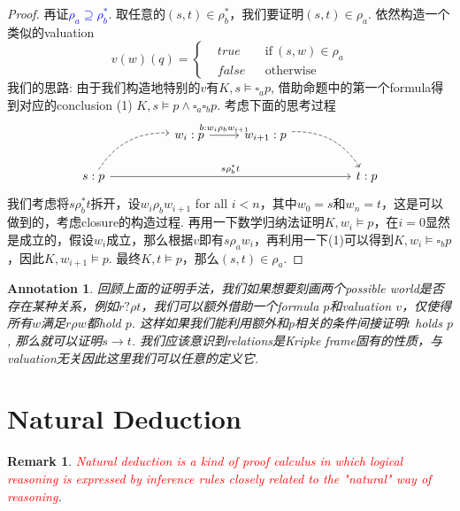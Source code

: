 \documentclass{article}
\theoremstyle{plain}
\newtheorem{remark}[theorem]{Remark}
\newtheorem{annotation}[theorem]{Annotation}
\theoremstyle{nonumberplain}
\newtheorem{proof}{Proof}
\newcommand{\redt}[1]{\textcolor{red}{#1}}
\newcommand{\bluet}[1]{\textcolor{blue}{#1}}
\begin{document}
\begin{proof}
再证\bluet{$\rho_a \supseteq \rho_b^*$}. 取任意的$(s,t) \in \rho_b^*$，我们要证明$(s,t) \in \rho_a$. 依然构造一个类似的valuation
$$
v(w)(q) = \left\{
\begin{aligned}
&true && \text{if}~(s,w) \in \rho_a \\
&false && \text{otherwise}
\end{aligned}
\right.
$$
我们的思路: 由于我们构造地特别的$v$有$K,s \vDash \square_a p$, 借助命题中的第一个formula得到对应的conclusion (1) $K,s \vDash p \wedge \square_a\square_b p$. 考虑下面的思考过程
$$
\begin{tikzcd}
                                                                 &  & w_i:p \arrow[r, "b: w_i \rho_b w_{i+1}"] & w_{i+1}:p \arrow[rrd, dashed, bend left] &  &     \\
s:p \arrow[rrrrr, "s \rho_b^* t"] \arrow[rru, dashed, bend left] &  &                                          &                                          &  & t:p
\end{tikzcd}
$$
我们考虑将$s \rho_b^* t$拆开，设$w_i \rho_b w_{i+1}$ for all $i < n$，其中$w_0 = s$和$w_n = t$，这是可以做到的，考虑closure的构造过程. 再用一下数学归纳法证明$K, w_i \vDash p$，在$i=0$显然是成立的，假设$w_i$成立，那么根据$v$即有$s \rho_a w_i$，再利用一下(1)可以得到$K,w_i \vDash \square_b p$，因此$K,w_{i+1} \vDash p$. 最终$K,t \vDash p$，那么$(s,t) \in \rho_a$. 
\end{proof}

\begin{annotation}
\rm 回顾上面的证明手法，我们如果想要刻画两个possible world是否存在某种关系，例如$r ?\rho t$，我们可以额外借助一个formula $p$和valuation $v$，仅使得所有$w$满足$r \rho w$都hold $p$. 这样如果我们能利用额外和$p$相关的条件间接证明$t$ holds $p$, 那么就可以证明$s \to t$. 我们应该意识到relations是Kripke frame固有的性质，与valuation无关因此这里我们可以任意的定义它.  
\end{annotation}

\newpage
\section{Natural Deduction}

\begin{remark}
\rm \redt{Natural deduction is a kind of proof calculus in which logical reasoning is expressed by inference rules closely related to the "natural" way of reasoning}. 
\end{remark}
\end{document}
